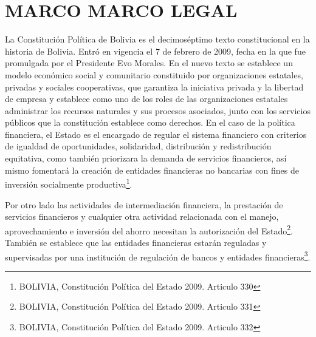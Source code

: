 \chapter{MARCO MARCO LEGAL}
La Constitución Política de Bolivia es el decimoséptimo texto constitucional en la historia de Bolivia. Entró en vigencia el 7 de febrero de 2009, fecha en la que fue promulgada por el Presidente Evo Morales.
En el nuevo texto se establece un modelo económico social y comunitario constituido por organizaciones estatales, privadas y sociales cooperativas, que garantiza la iniciativa privada y la libertad de empresa y establece como uno de los roles de las organizaciones estatales administrar los recursos naturales y sus procesos asociados, junto con los servicios públicos que la constitución establece como derechos.
En el caso de la política financiera, el Estado es el encargado de regular el sistema financiero con criterios de igualdad de oportunidades, solidaridad, distribución y redistribución equitativa, como también priorizara la demanda de servicios financieros, así mismo fomentará la creación de entidades financieras no bancarias con fines de inversión socialmente productiva\footnote{BOLIVIA, Constitución Política del Estado 2009. Articulo 330}.

Por otro lado las actividades de intermediación financiera, la prestación de servicios financieros y cualquier otra actividad relacionada con el manejo, aprovechamiento e inversión del ahorro necesitan la autorización del Estado\footnote{BOLIVIA, Constitución Política del Estado 2009. Articulo 331}.
También se establece que las entidades financieras estarán reguladas y supervisadas por una institución de regulación de bancos y entidades financieras\footnote{BOLIVIA, Constitución Política del Estado 2009. Articulo 332}.




%
